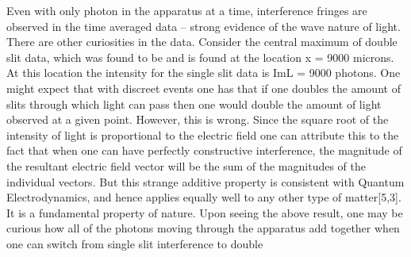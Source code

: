 \documentclass[12pt,twocolumn]{article}
\begin{document}
Even with only photon in the apparatus at a time, interference fringes are  observed in the time averaged data – strong evidence of the wave nature of light. There are other curiosities in the data. Consider the central maximum of double slit data, which was found to be and is found at the location x = 9000 microns. At this location the intensity for the single slit data is ImL = 9000 photons. One might expect that with discreet events one has that if one doubles the amount of slits through which light can pass then one would double the amount of light observed at a given point. However, this is wrong.  Since the square root of the intensity of light is proportional to the electric field one can attribute this to the fact that when one can have perfectly constructive interference, the magnitude of the resultant electric field vector will be the sum of the magnitudes of the individual vectors.  But this strange additive property is consistent with Quantum Electrodynamics, and hence applies equally well to any other type of matter[5,3]. It is a fundamental property of nature. Upon seeing the above result, one may be curious how all of the photons moving through the apparatus add together when one can switch from single slit interference to double


\nocite{*}


\end{document}
